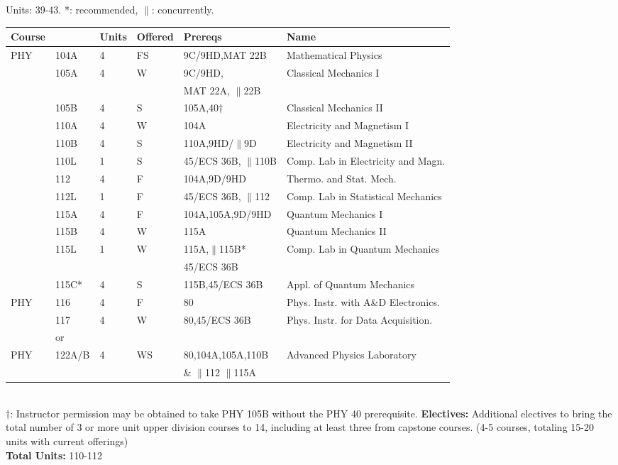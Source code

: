 \documentclass[12pt]{article}
\begin{document}
\newpage
{}
\vskip 0.5cm
\noindent
Units:  39-43. *: recommended, $\parallel$: concurrently.\\
\begin{tabular}{|llllll|}
\hline
Course & & Units & Offered & Prereqs & Name \\
\hline
PHY & 104A & 4 & FS & 9C/9HD,MAT 22B   & Mathematical Physics \\ 
    & 105A & 4 & W & 9C/9HD, & Classical Mechanics I\\
    &      &   &   & MAT 22A, $\parallel$22B & \\
    & 105B & 4 & S & 105A,40$\dagger$          & Classical Mechanics II\\ 
    & 110A & 4 & W & 104A             & Electricity and Magnetism I\\
    & 110B & 4 & S & 110A,9HD/$\parallel$9D    & Electricity and Magnetism II\\
    & 110L & 1 & S & 45/ECS 36B, $\parallel$110B & Comp. Lab in Electricity and Magn. \\
    & 112  & 4 & F & 104A,9D/9HD      & Thermo. and Stat. Mech.\\    
    & 112L & 1 & F & 45/ECS 36B, $\parallel$112  & Comp. Lab in Statistical Mechanics \\ 
    & 115A & 4 & F & 104A,105A,9D/9HD & Quantum Mechanics I \\
    & 115B & 4 & W & 115A             & Quantum Mechanics II \\
    & 115L & 1 & W & 115A,$\parallel$115B*  & Comp. Lab in Quantum Mechanics \\
           & & & & 45/ECS 36B & \\
    & 115C* & 4 & S & 115B,45/ECS 36B& Appl. of Quantum Mechanics\\ 
\hline
\hline
PHY & 116 & 4 &  F & 80              & Phys. Instr. with A\&D Electronics.  \\
    & 117 & 4 &  W & 80,45/ECS 36B   & Phys. Instr. for Data Acquisition. \\ 
\hline
    & or & & & & \\
\hline
PHY & 122A/B & 4 & WS & 80,104A,105A,110B & Advanced Physics Laboratory \\  
    &  & & & \& $\parallel$112 $\parallel$115A&  \\  

\hline
\hline
\end{tabular}\\ 
\noindent
$\dagger$:  Instructor permission may be obtained to take PHY 105B without the PHY 40 prerequisite.
\noindent
{\bf Electives:} Additional electives to bring the total number of 3 or more
unit upper division courses to 14, including at least three from
capstone courses.  (4-5 courses, totaling 15-20 units with current
offerings) \\
\noindent
{\bf Total Units:} 110-112
\end{document}
